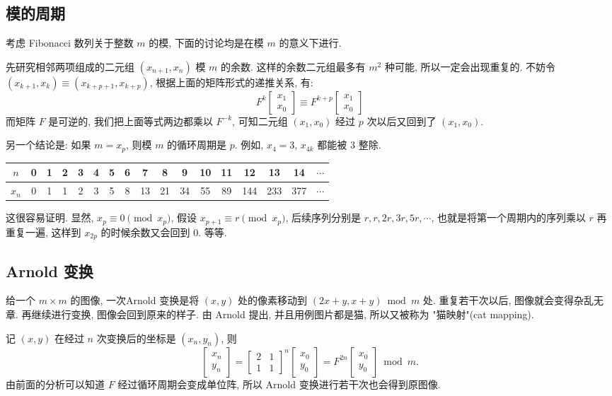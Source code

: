 \subsection {模的周期}
考虑 Fibonacci 数列关于整数 $m$ 的模, 下面的讨论均是在模 $m$ 的意义下进行. 

先研究相邻两项组成的二元组 $(x_{n+1},x_n)$ 模 $m$ 的余数. 这样的余数二元组最多有 $ m^2 $ 种可能, 所以一定会出现重复的. 不妨令 $(x_{k+1},x_k) \equiv (x_{k+p+1},x_{k+p}) $, 根据上面的矩阵形式的递推关系, 有:
\[
F^k
\begin{bmatrix}
x_{1} \\ x_0
\end{bmatrix}
\equiv  F^{k+p}
\begin{bmatrix}
x_{1} \\ x_0
\end{bmatrix}
\]
而矩阵 $ F $ 是可逆的, 我们把上面等式两边都乘以 $ F^{-k} $, 可知二元组 $(x_1,x_0)$ 经过 $ p $ 次以后又回到了 $(x_1,x_0)$. 

另一个结论是: 如果 $ m = x_p $, 则模 $ m $ 的循环周期是 $ p $. 例如, $ x_4 = 3 $, $ x_{4k} $ 都能被 $ 3 $ 整除.
\begin{table}[h!]
\centering
\begin{tabular}{ c c c c c c c c c c c c c c c c c }
\hline 
$n$ & 0 & 1 & 2 & 3 & 4 & 5 & 6 & 7 & 8 & 9 & 10 & 11 & 12 & 13 & 14 & $\cdots$\\
\hline 
$x_{n}$ & 0 & 1 & 1 & 2 & 3 & 5 & 8 & 13 & 21 & 34 & 55 & 89 & 144 & 233 & 377 & $\cdots$ \\
\hline 
\end{tabular}
\end{table}

这很容易证明. 显然, $ x_p \equiv 0 \pmod{x_p}$, 假设 $ x_{p+1} \equiv r \pmod{x_p} $, 后续序列分别是 $ r, r, 2r, 3r, 5r, \cdots $, 也就是将第一个周期内的序列乘以 $ r $ 再重复一遍, 这样到 $ x_{2p} $ 的时候余数又会回到 $ 0 $. 等等.

\subsection {Arnold 变换}

给一个 $ m\times m $ 的图像, 一次Arnold 变换是将 $ (x,y) $ 处的像素移动到 $ (2x+y, x+y) \bmod{m}$ 处. 重复若干次以后, 图像就会变得杂乱无章. 再继续进行变换, 图像会回到原来的样子. 由 Arnold 提出, 并且用例图片都是猫, 所以又被称为 "猫映射"(cat mapping).

记 $(x, y)$ 在经过 $n$ 次变换后的坐标是 $(x_n,y_n)$, 则
\[
\begin{bmatrix}
x_n \\ y_n
\end{bmatrix}
=\begin{bmatrix}
2 & 1 \\ 1 & 1
\end{bmatrix}^n
\begin{bmatrix}
x_0 \\ y_0
\end{bmatrix} = F^{2n} \begin{bmatrix}
x_0 \\ y_0
\end{bmatrix} \bmod{m}.
\]
由前面的分析可以知道 $F$ 经过循环周期会变成单位阵, 所以 Arnold 变换进行若干次也会得到原图像.

